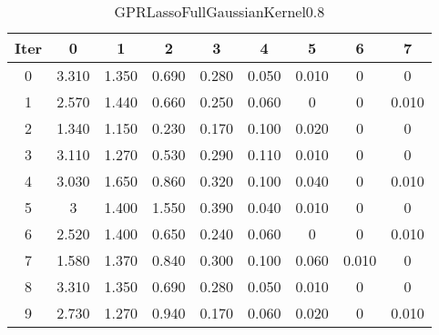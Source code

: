 \begin{table}
	\begin{center}
		\begin{tabular}{|c|c|c|c|c|c|c|c|c|}
			\hline
			Iter & 0 & 1 & 2 & 3 & 4 & 5 & 6 & 7 \\
			\hline
			0 & 3.310 & 1.350 & 0.690 & 0.280 & 0.050 & 0.010 & 0 & 0 \\
			\hline
			1 & 2.570 & 1.440 & 0.660 & 0.250 & 0.060 & 0 & 0 & 0.010 \\
			\hline
			2 & 1.340 & 1.150 & 0.230 & 0.170 & 0.100 & 0.020 & 0 & 0 \\
			\hline
			3 & 3.110 & 1.270 & 0.530 & 0.290 & 0.110 & 0.010 & 0 & 0 \\
			\hline
			4 & 3.030 & 1.650 & 0.860 & 0.320 & 0.100 & 0.040 & 0 & 0.010 \\
			\hline
			5 & 3 & 1.400 & 1.550 & 0.390 & 0.040 & 0.010 & 0 & 0 \\
			\hline
			6 & 2.520 & 1.400 & 0.650 & 0.240 & 0.060 & 0 & 0 & 0.010 \\
			\hline
			7 & 1.580 & 1.370 & 0.840 & 0.300 & 0.100 & 0.060 & 0.010 & 0 \\
			\hline
			8 & 3.310 & 1.350 & 0.690 & 0.280 & 0.050 & 0.010 & 0 & 0 \\
			\hline
			9 & 2.730 & 1.270 & 0.940 & 0.170 & 0.060 & 0.020 & 0 & 0.010 \\
			\hline
		\end{tabular}
	\end{center}
	\caption{GPRLassoFullGaussianKernel0.8}
\end{table}